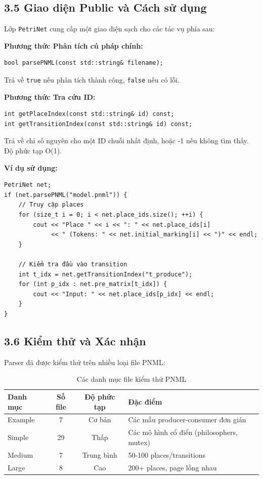 \documentclass[12pt,a4paper]{article}
\begin{document}
\subsection*{3.5 Giao diện Public và Cách sử dụng}

Lớp \texttt{PetriNet} cung cấp một giao diện sạch cho các tác vụ phía sau:

\textbf{Phương thức Phân tích cú pháp chính:}
\begin{verbatim}
bool parsePNML(const std::string& filename);
\end{verbatim}
Trả về \texttt{true} nếu phân tích thành công, \texttt{false} nếu có lỗi.

\textbf{Phương thức Tra cứu ID:}
\begin{verbatim}
int getPlaceIndex(const std::string& id) const;
int getTransitionIndex(const std::string& id) const;
\end{verbatim}
Trả về chỉ số nguyên cho một ID chuỗi nhất định, hoặc -1 nếu không tìm thấy. Độ phức tạp O(1).

\textbf{Ví dụ sử dụng:}
\begin{verbatim}
PetriNet net;
if (net.parsePNML("model.pnml")) {
    // Truy cập places
    for (size_t i = 0; i < net.place_ids.size(); ++i) {
        cout << "Place " << i << ": " << net.place_ids[i]
             << " (Tokens: " << net.initial_marking[i] << ")" << endl;
    }
    
    // Kiểm tra đầu vào transition
    int t_idx = net.getTransitionIndex("t_produce");
    for (int p_idx : net.pre_matrix[t_idx]) {
        cout << "Input: " << net.place_ids[p_idx] << endl;
    }
}
\end{verbatim}

\subsection*{3.6 Kiểm thử và Xác nhận}

Parser đã được kiểm thử trên nhiều loại file PNML:

\begin{table}[h]
\centering
\begin{tabular}{|l|c|c|l|}
\hline
\textbf{Danh mục} & \textbf{Số file} & \textbf{Độ phức tạp} & \textbf{Đặc điểm} \\
\hline
Example & 7 & Cơ bản & Các mẫu producer-consumer đơn giản \\
Simple & 29 & Thấp & Các mô hình cổ điển (philosophers, mutex) \\
Medium & 7 & Trung bình & 50-100 places/transitions \\
Large & 8 & Cao & 200+ places, page lồng nhau \\
\hline
\end{tabular}
\caption{Các danh mục file kiểm thử PNML}
\end{table}
\end{document}
